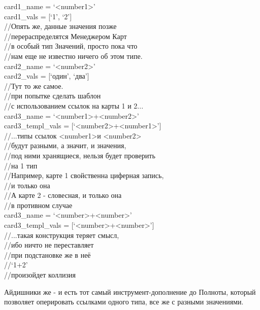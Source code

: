 \documentclass{book}
\newcommand{\less}{\textless}
\newcommand{\more}{\textgreater}
\begin{document}
\begin{tcolorbox}[breakable]
card1\_name = `\less number1\more' \\
card1\_vals = [`1', `2'] \\
//Опять же, данные значения позже \\
//перераспределятся Менеджером Карт \\
//в особый тип Значений, просто пока что \\
//нам еще не известно ничего об этом типе. \\

card2\_name = `\less number2\more' \\
card2\_vals = [`один', `два'] \\
//Тут то же самое. \\

//при попытке сделать шаблон \\
//с использованием ссылок на карты 1 и 2... \\

card3\_name = `\less number1\more+\less number2\more' \\
card3\_templ\_vals = [`\less number2\more+\less number1\more'] \\
//...типы ссылок \less number1\more и \less number2\more \\
//будут разными, а значит, и значения, \\
//под ними хранящиеся, нельзя будет проверить \\
//на 1 тип \\
//Например, карте 1 свойственна циферная запись, \\
//и только она \\
//А карте 2 - словесная, и только она \\

//в противном случае \\
card3\_name = `\less number\more+\less number\more' \\
card3\_templ\_vals = [`\less number\more+\less number\more'] \\
//...такая конструкция теряет смысл, \\
//ибо ничто не переставляет \\

//при подстановке же в неё \\
//`1+2' \\
//произойдет коллизия
\end{tcolorbox}

Айдишники же - и есть тот самый инструмент-дополнение до Полноты, который позволяет 
оперировать ссылками одного типа, все же с разными значениями.
\end{document}
